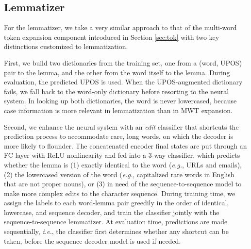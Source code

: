 \documentclass[11pt,a4paper]{article}
\begin{document}
\subsection{Lemmatizer}

For the lemmatizer, we take a very similar approach to that of the multi-word token expansion component introduced in Section \ref{sec:tok} with two key distinctions customized to lemmatization.

First, we build two dictionaries from the training set, one from a (word, UPOS) pair to the lemma, and the other from the word itself to the lemma.
During evaluation, the predicted UPOS is used.
When the UPOS-augmented dictionary fails, we fall back to the word-only dictionary before resorting to the neural system.
In looking up both dictionaries, the word is never lowercased, because case information is more relevant in lemmatization than in MWT expansion.

Second, we enhance the neural system with an \textit{edit} classifier that shortcuts the prediction process to accommodate rare, long words, on which the decoder is more likely to flounder.
The concatenated encoder final states are put through an FC layer with ReLU nonlinearity and fed into a 3-way classifier, which predicts whether the lemma is (1) exactly identical to the word (\emph{e.g.}, URLs and emails), (2) the lowercased version of the word (\emph{e.g.}, capitalized rare words in English that are not proper nouns), or (3) in need of the sequence-to-sequence model to make more complex edits to the character sequence.
During training time, we assign the labels to each word-lemma pair greedily in the order of identical, lowercase, and sequence decoder, and train the classifier jointly with the sequence-to-sequence lemmatizer.
At evaluation time, predictions are made sequentially, \emph{i.e.}, the classifier first determines whether any shortcut can be taken, before the sequence decoder model is used if needed.
\end{document}
